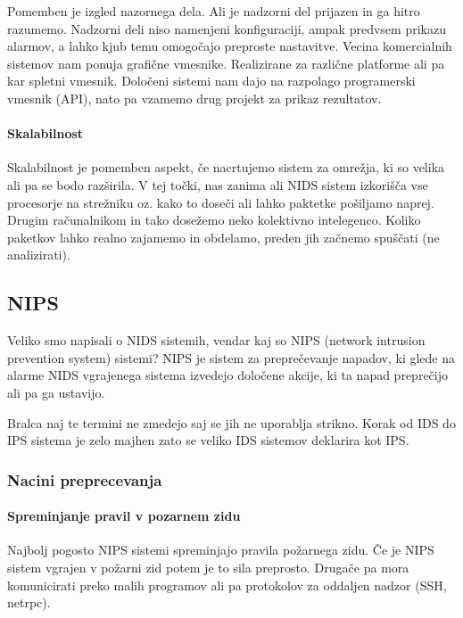 \documentclass[12pt]{article}
\begin{document}
Pomemben je izgled nazornega dela. Ali je nadzorni del prijazen in ga hitro razumemo.
Nadzorni deli niso namenjeni konfiguraciji, ampak predvsem prikazu alarmov, a lahko kjub temu omogočajo preproste nastavitve.
Vecina komercialnih sistemov nam ponuja grafične vmesnike. Realizirane za različne platforme ali pa kar spletni vmesnik.
Določeni sistemi nam dajo na razpolago programerski vmesnik (API), nato pa vzamemo drug projekt za prikaz rezultatov.



\paragraph{Skalabilnost} %

Skalabilnost je pomemben aspekt, če nacrtujemo sistem za omrežja, ki so velika ali pa se bodo razširila. 
V tej točki, nas zanima ali NIDS sistem izkorišča vse procesorje na strežniku oz. kako to doseči ali lahko paktetke pošiljamo naprej. Drugim računalnikom in tako dosežemo neko kolektivno intelegenco.
Koliko paketkov lahko realno zajamemo in obdelamo, preden jih začnemo spuščati (ne analizirati).


\subsection{NIPS}

Veliko smo napisali o NIDS sistemih, vendar kaj so NIPS (network intrusion prevention system) sistemi?
NIPS je sistem za preprečevanje napadov, ki glede na alarme NIDS vgrajenega sistema izvedejo določene akcije, ki ta napad preprečijo ali pa ga ustavijo.

Bralca naj te termini ne zmedejo saj se jih ne uporablja strikno. Korak od IDS do IPS sistema je zelo majhen zato se veliko IDS sistemov deklarira kot IPS.

\subsubsection{Nacini preprecevanja} %

\paragraph{Spreminjanje pravil v pozarnem zidu} %

Najbolj pogosto NIPS sistemi spreminjajo pravila požarnega zidu.
Če je NIPS sistem vgrajen v požarni zid potem je to sila preprosto.
Drugače pa mora komunicirati preko malih programov ali pa protokolov za oddaljen nadzor (SSH, netrpc).
\end{document}
